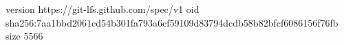 version https://git-lfs.github.com/spec/v1
oid sha256:7aa1bbd2061cd54b301fa793a6cf59109d83794dcdb58b82bfcf6086156f76fb
size 5566
